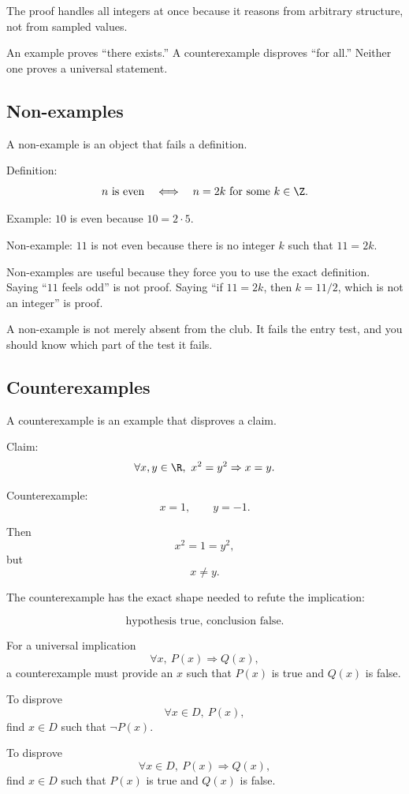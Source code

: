 The proof handles all integers at once because it reasons from arbitrary structure, not from sampled values.

\begin{trapbox}
An example proves ``there exists.'' A counterexample disproves ``for all.'' Neither one proves a universal statement.
\end{trapbox}

\subsection{Non-examples}

A non-example is an object that fails a definition.

Definition:
\[
n\text{ is even}\quad\Longleftrightarrow\quad n=2k\text{ for some }k\in\Z.
\]

Example: $10$ is even because $10=2\cdot5$.

Non-example: $11$ is not even because there is no integer $k$ such that $11=2k$.

Non-examples are useful because they force you to use the exact definition. Saying ``$11$ feels odd'' is not proof. Saying ``if $11=2k$, then $k=11/2$, which is not an integer'' is proof.

\begin{intuitionbox}
A non-example is not merely absent from the club. It fails the entry test, and you should know which part of the test it fails.
\end{intuitionbox}

\subsection{Counterexamples}

A counterexample is an example that disproves a claim.

Claim:
\[
\forall x,y\in\R,\ x^2=y^2\Rightarrow x=y.
\]

Counterexample:
\[
x=1,\qquad y=-1.
\]

Then
\[
x^2=1=y^2,
\]
but
\[
x\neq y.
\]

The counterexample has the exact shape needed to refute the implication:

\[
\text{hypothesis true, conclusion false.}
\]

For a universal implication
\[
\forall x,\ P(x)\Rightarrow Q(x),
\]
a counterexample must provide an $x$ such that $P(x)$ is true and $Q(x)$ is false.

\begin{formalbox}
To disprove
\[
\forall x\in D,\ P(x),
\]
find $x\in D$ such that $\neg P(x)$.

To disprove
\[
\forall x\in D,\ P(x)\Rightarrow Q(x),
\]
find $x\in D$ such that $P(x)$ is true and $Q(x)$ is false.
\end{formalbox}

